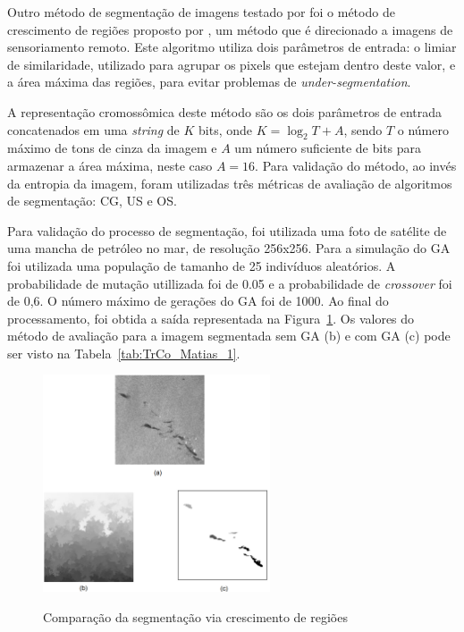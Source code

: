 \documentclass[12pt,oneside,a4paper,english,french,spanish,brazil,]{abntex2}
\begin{document}
Outro método de segmentação de imagens testado por \citet{matias:2007} foi o método de crescimento de regiões proposto por \citet{bins:1996}, um método que é direcionado a imagens de sensoriamento remoto. Este algoritmo utiliza dois parâmetros de entrada: o limiar de similaridade, utilizado para agrupar os pixels que estejam dentro deste valor, e a área máxima das regiões, para evitar problemas de \textit{under-segmentation}.


A representação cromossômica deste método são os dois parâmetros de entrada concatenados em uma \textit{string} de \(K\) bits, onde \(K = \log_2 T + A\), sendo \(T\) o número máximo de tons de cinza da imagem e \(A\) um número suficiente de bits para armazenar a área máxima, neste caso \(A = 16\). Para validação do método, ao invés da entropia da imagem, foram utilizadas três métricas de avaliação de algoritmos de segmentação: CG, US e OS.

Para validação do processo de segmentação, foi utilizada uma foto de satélite de uma mancha de petróleo no mar, de resolução 256x256. Para a simulação do GA foi utilizada uma população de tamanho de 25 indivíduos aleatórios. A probabilidade de mutação utillizada foi de 0.05 e a probabilidade de \textit{crossover} foi de 0,6. O número máximo de gerações do GA foi de 1000. Ao final do processamento, foi obtida a saída representada na Figura~\ref{fig:TrCo_Matias_Crescimento_1}. Os valores do método de avaliação para a imagem segmentada sem GA (b) e com GA (c) pode ser visto na Tabela~\ref{tab:TrCo_Matias_1}.

\begin{figure}[ht]
\centering
\caption{Comparação da segmentação via crescimento de regiões}
\includegraphics[width=0.6\textwidth]{imagens/TrCo_Matias_Crescimento_1.PNG}
\label{fig:TrCo_Matias_Crescimento_1}
\end{figure}
\end{document}
